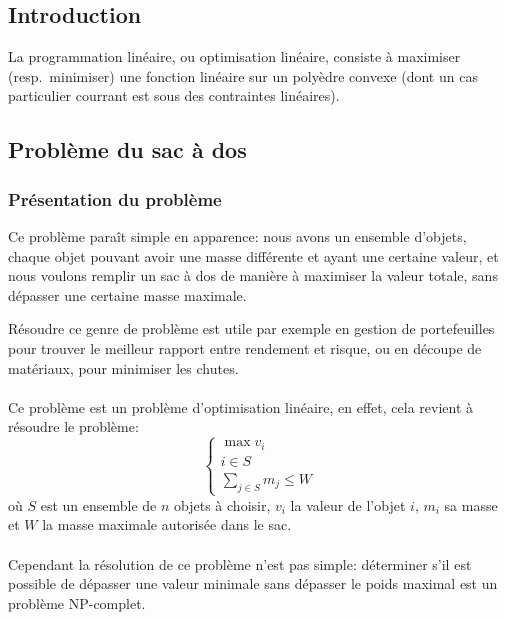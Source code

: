 \subsection{Introduction}
  La programmation linéaire, ou optimisation linéaire, consiste à maximiser
  (resp.\ minimiser) une fonction linéaire sur un polyèdre convexe (dont un cas
  particulier courrant est sous des contraintes linéaires).

\subsection{Problème du sac à dos}
  \subsubsection{Présentation du problème}
    Ce problème paraît simple en apparence: nous avons un ensemble d'objets,
    chaque objet pouvant avoir une masse différente et ayant une certaine
    valeur, et nous voulons remplir un sac à dos de manière à maximiser la
    valeur totale, sans dépasser une certaine masse maximale.

    Résoudre ce genre de problème est utile par exemple en gestion de
    portefeuilles pour trouver le meilleur rapport entre rendement et risque,
    ou en découpe de matériaux, pour minimiser les chutes.

    \paragraph{}
    Ce problème est un problème d'optimisation linéaire, en effet, cela revient
    à résoudre le problème:
    \[ \left\{ \begin{array}{l}
        \max v_i \\
        i \in S \\
        \displaystyle\sum_{j \in S} m_j \leq W
      \end{array} \right.
    \]
    où $S$ est un ensemble de $n$ objets à choisir, $v_i$ la valeur de l'objet
    $i$, $m_i$ sa masse et $W$ la masse maximale autorisée dans le sac.

    \paragraph{}
    Cependant la résolution de ce problème n'est pas simple: déterminer s'il
    est possible de dépasser une valeur minimale sans dépasser le poids maximal
    est un problème NP\nobreakdash-complet.


